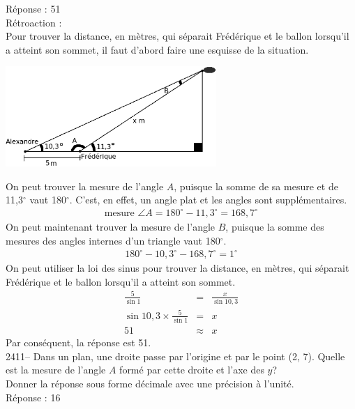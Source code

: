 \documentclass[letterpaper, 12pt]{article}
\begin{document}
R\'eponse : 51\\

R\'etroaction :\\
Pour trouver la distance, en m\`etres, qui s\'eparait Fr\'ed\'erique et le ballon lorsqu'il a atteint son sommet, il faut d'abord faire une esquisse de la situation.
\begin{center}
 \includegraphics[width=8cm,bb=0 408 689 842]{Q2410.eps}
\end{center}
On peut trouver la mesure de l'angle $A$, puisque la somme de sa mesure et de 11,3$^{\circ}$ vaut 180$^{\circ}$. C'est, en effet, un angle plat et les angles sont suppl\'ementaires.
\begin{eqnarray*}
\textrm{mesure }\angle{A} = 180^{\circ}-11,3^{\circ} = 168,7 ^{\circ}
\end{eqnarray*}
On peut maintenant trouver la mesure de l'angle $B$, puisque la somme des mesures des angles internes d'un triangle vaut 180$^{\circ}$.
\begin{eqnarray*}
 180^{\circ}-10,3^{\circ}-168,7^{\circ}=1^{\circ}
\end{eqnarray*}
On peut utiliser la loi des sinus pour trouver la distance, en m\`etres,  qui s\'eparait Fr\'ed\'erique et le ballon lorsqu'il a atteint son sommet.
\begin{eqnarray*}
 \frac{5}{\sin{1}}&=& \frac{x}{\sin{10,3}}\\[2mm]
 \sin{10,3} \times \frac{5}{\sin{1}}&=&  x\\[2mm]
 51&\approx&  x
\end{eqnarray*}
Par cons\'equent, la r\'eponse est 51.\\

2411--  Dans un plan, une droite passe par l'origine et par le point (2, 7). Quelle est la mesure de l'angle $A$ form\'e par cette droite et l'axe des $y$?\\
Donner la r\'eponse sous forme d\'ecimale avec une pr\'ecision \`a l'unit\'e.\\

R\'eponse : 16\\
\end{document}
